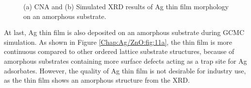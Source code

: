 \newpage
\begingroup
\begin{figure}[!ht]
  \centering
  \label{Chap:Ag/ZnO:fig:11a}
  \label{Chap:Ag/ZnO:fig:11b}
\caption[CNA and Simulated XRD results of Ag thin film morphology on an amorphous substrate.]{(a) \ac{CNA} and (b) Simulated \ac{XRD} results of Ag thin film morphology on an amorphous substrate.}
\label{Chap:Ag/ZnO:fig11}
\end{figure}
\endgroup

At last, Ag thin film is also deposited on an amorphous substrate during \ac{GCMC} simulation. As shown in Figure \ref{Chap:Ag/ZnO:fig:11a}, the thin film is more continuous compared to other ordered lattice substrate structures, because of amorphous substrates containing more surface defects acting as a trap site for Ag adsorbates. However, the quality of Ag thin film is not desirable for industry use, as the thin film shows an amorphous structure from the \ac{XRD}.